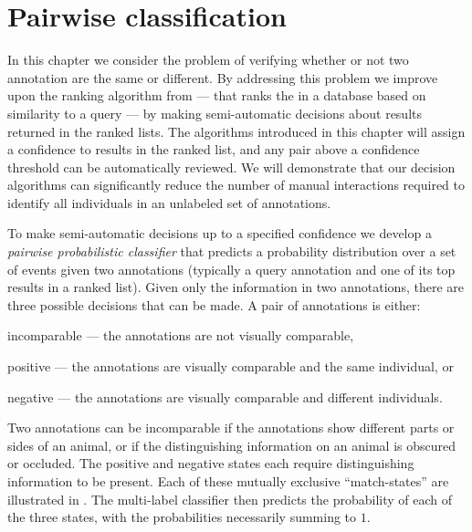 \chapter{Pairwise classification}\label{chap:pairclf}

In this chapter we consider the problem of verifying whether or not two
  annotation are the same or different.
By addressing this problem we improve upon the ranking algorithm from
   --- that ranks the \names{} in a database based on
  similarity to a query --- by making semi-automatic decisions about results
  returned in the ranked lists.
The algorithms introduced in this chapter will assign a confidence to results
  in the ranked list, and any pair above a confidence threshold can be
  automatically reviewed.
We will demonstrate that our decision algorithms can significantly reduce the
  number of manual interactions required to identify all individuals in an
  unlabeled set of annotations.

To make semi-automatic decisions up to a specified confidence we develop a
  \emph{pairwise probabilistic classifier} that predicts a probability
  distribution over a set of events given two annotations (typically a query
  annotation and one of its top results in a ranked list).
Given only the information in two annotations,  there are three possible
  decisions that can be made.
A pair of annotations is either:
\begin{enumln}
    \item incomparable --- the annotations are not visually comparable,

    \item positive --- the annotations are visually comparable and the
      same individual, or

    \item negative --- the annotations are visually comparable and different
      individuals.
\end{enumln}
Two annotations can be incomparable if the annotations show different parts or
  sides of an animal, or if the distinguishing information on an animal is
  obscured or occluded.
The positive and negative states each require distinguishing information to be
  present.
Each of these mutually exclusive ``match-states'' are illustrated in
  .
The multi-label classifier then predicts the probability of each of the three
  states, with the probabilities necessarily summing to $1$.

